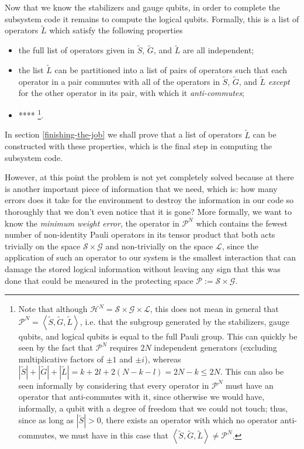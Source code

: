 \documentclass[twocolumn,showpacs,preprintnumbers,amsmath,amssymb,nofootinbib,pra,floatfix]{revtex4}
\begin{document}
Now that we know the stabilizers and gauge qubits, in order to complete the subsystem code it remains to compute the logical qubits. Formally, this is a list of operators $\tilde L$ which satisfy the following properties
\begin{itemize}
\item the full list of operators given in $\tilde S$, $\tilde G$, and $\tilde L$ are all independent;
\item the list $\tilde L$ can be partitioned into a list of pairs of operators such that each operator in a pair commutes with all of the operators in $\tilde S$, $\tilde G$, and $\tilde L$ \emph{except} for the other operator in its pair, with which it \emph{anti-commutes};
\item **** \footnote{Note that although $\mathscr{H}^N=\mathscr{S}\times\mathscr{G}\times\mathscr{L}$, this does not mean in general that $\mathcal{P}^N=\left<\tilde S,\tilde G,\tilde L\right>$, i.e. that the subgroup generated by the stabilizers, gauge qubits, and logical qubits is equal to the full Pauli group.  This can quickly be seen by the fact that $\mathcal{P}^N$ requires $2N$ independent generators (excluding multiplicative factors of $\pm 1$ and $\pm i$), whereas $|\tilde S|+|\tilde G|+|\tilde L|=k+2l+2(N-k-l)=2N-k\le 2N$.  This can also be seen informally by considering that every operator in $\mathcal{P}^N$ must have an operator that anti-commutes with it, since otherwise we would have, informally, a qubit with a degree of freedom that we could not touch; thus, since as long as $|\tilde S|>0$, there exists an operator with which no operator anti-commutes, we must have in this case that $\left<\tilde S,\tilde G,\tilde L\right>\ne \mathcal{P}^N$.}.
\end{itemize}
In section \ref{finishing-the-job} we shall prove that a list of operators $\tilde L$ can be constructed with these properties, which is the final step in computing the subsystem code.

However, at this point the problem is not yet completely solved because at there is another important piece of information that we need, which is:  how many errors does it take for the environment to destroy the information in our code so thoroughly that we don't even notice that it is gone?  More formally, we want to know the \emph{minimum weight error}, the operator in $\mathcal{P}^N$ which contains the fewest number of non-identity Pauli operators in its tensor product that both acts trivially on the space $\mathscr{S}\times\mathscr{G}$ and non-trivially on the space $\mathscr{L}$, since the application of such an operator to our system is the smallest interaction that can damage the stored logical information without leaving any sign that this was done that could be measured in the protecting space $\mathscr{P}:=\mathscr{S}\times\mathscr{G}$.
\end{document}
